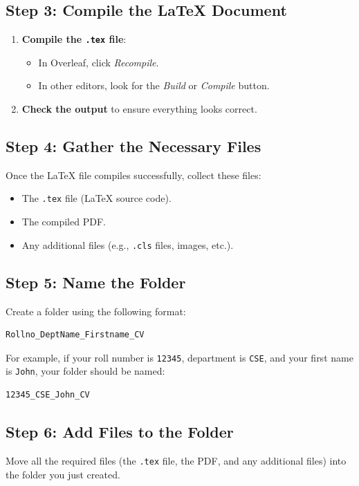 \documentclass{article}
\begin{document}
\begin{normalsize}
\subsection{Step 3: Compile the LaTeX Document}
\begin{enumerate}
    \item \textbf{Compile the \texttt{.tex} file}: 
    \begin{itemize}
        \item In Overleaf, click \textit{Recompile}.
        \item In other editors, look for the \textit{Build} or \textit{Compile} button.
    \end{itemize}
    \item \textbf{Check the output} to ensure everything looks correct.
\end{enumerate}

\subsection{Step 4: Gather the Necessary Files}
Once the LaTeX file compiles successfully, collect these files:
\begin{itemize}
    \item The \texttt{.tex} file (LaTeX source code).
    \item The compiled PDF.
    \item Any additional files (e.g., \texttt{.cls} files, images, etc.).
\end{itemize}

\subsection{Step 5: Name the Folder}
Create a folder using the following format:
\begin{verbatim}
Rollno_DeptName_Firstname_CV
\end{verbatim}
For example, if your roll number is \texttt{12345}, department is \texttt{CSE}, and your first name is \texttt{John}, your folder should be named:
\begin{verbatim}
12345_CSE_John_CV
\end{verbatim}

\subsection{Step 6: Add Files to the Folder}
Move all the required files (the \texttt{.tex} file, the PDF, and any additional files) into the folder you just created.


\end{normalsize}
\end{document}
